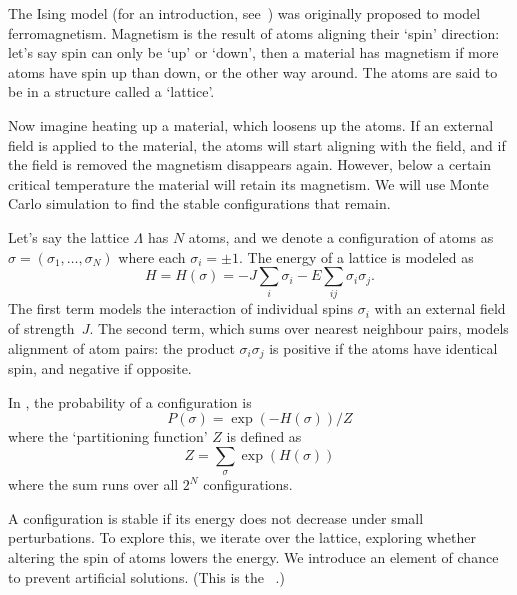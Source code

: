 
The Ising model (for an introduction, see~\cite{Cipra:Ising}) was
originally proposed to model ferromagnetism. Magnetism is the result
of atoms aligning their `spin' direction: let's say spin can only be
`up' or `down', then a material has magnetism if more atoms have spin
up than down, or the other way around. The atoms are said to be in a
structure called a `lattice'.

Now imagine heating up a material, which loosens up the atoms. If an
external field is applied to the material, the atoms will start
aligning with the field, and if the field is removed the magnetism
disappears again. However, below a certain critical temperature the
material will retain its magnetism.
We will use Monte Carlo simulation to find the stable configurations
that remain.

Let's say the lattice $\Lambda$ has $N$ atoms, and we denote a
configuration of atoms as $\sigma=(\sigma_1,\ldots,\sigma_N)$ where
each $\sigma_i=\pm1$.
The energy of a lattice is modeled as
\[ H=H(\sigma)=-J\sum_i\sigma_i-E\sum_{ij}\sigma_i\sigma_j. \]
The first term models the interaction of individual spins $\sigma_i$
with an external field of strength~$J$. The second term, which sums
over nearest neighbour pairs, models
alignment of atom pairs: the product $\sigma_i\sigma_j$ is positive if
the atoms have identical spin, and negative if opposite.

In , the probability of a
configuration is 
\[ P(\sigma) = \exp(-H(\sigma))/Z \]
where the `partitioning function' $Z$ is defined as 
\[ Z = \sum_\sigma \exp(H(\sigma)) \]
where the sum runs over all $2^N$ configurations.

A configuration is stable if its energy does not decrease under small
perturbations. To explore this, we iterate over the lattice, exploring
whether altering the spin of atoms lowers the energy. We introduce an
element of chance to prevent artificial solutions. (This is the
~\cite{Metropolis}.)

